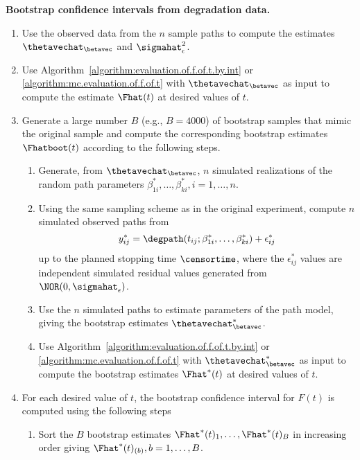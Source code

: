 \begin{algorithm}{\bfseries Bootstrap confidence intervals from
degradation data.}\\
\label{algorithm:degradation.bootstrap}
\begin{enumerate}
\item
Use the observed data from the $n$ sample paths to compute 
the estimates $\thetavechat_{\betavec}$ and $\sigmahat^{2}_{\epsilon}$.
\item
Use Algorithm~\ref{algorithm:evaluation.of.f.of.t.by.int} 
or \ref{algorithm:mc.evaluation.of.f.of.t} with
$\thetavechat_{\betavec}$ as input to compute 
the estimate $\Fhat(t)$
at desired values of $t$.
\item
Generate a large number $B$ (e.g., $B=4$000) of bootstrap samples
that mimic the original sample and compute the corresponding
bootstrap estimates $\Fhatboot(t)$ according to the following steps.
\begin{enumerate}
\item
Generate, from  $\thetavechat_{\betavec}$,
$n$ simulated realizations of the random path parameters 
$\beta_{1i}^{*},\dots,\beta_{ki}^{*}, i=1,\ldots,n$.
\item
Using the same sampling scheme as in the original experiment,
compute $n$ simulated observed paths from
\begin{displaymath}
y_{ij}^{*}=\degpath(t_{ij};\beta_{1i}^{*},\dots,\beta_{ki}^{*} ) +
\epsilon_{ij}^{*}
\end{displaymath}
up to the planned stopping time $\censortime$, where the
$\epsilon^{*}_{ij}$ values are independent simulated residual values
generated from $\NOR(0,\sigmahat_{\epsilon})$.
\item
Use the $n$ simulated paths to estimate parameters of the path
model, giving the bootstrap estimates $\thetavechat^{*}_{\betavec}$.
\item
Use Algorithm~\ref{algorithm:evaluation.of.f.of.t.by.int} 
or \ref{algorithm:mc.evaluation.of.f.of.t} with
$\thetavechat^{*}_{\betavec}$ as input to compute 
the bootstrap estimates $\Fhat^{*}(t)$
at desired values of $t$.
\end{enumerate}
\item
For each desired value of $t$, the bootstrap confidence interval
for $F(t)$ is computed using the following steps
\begin{enumerate}
\item
Sort the $B$ bootstrap estimates
$\Fhat^{*}(t)_{1}, \dots, \Fhat^{*}(t)_{B}$
in increasing order giving $\Fhat^{*}(t)_{(b)},b=1, \dots, B$.

\end{enumerate}
\end{enumerate}
\end{algorithm}
